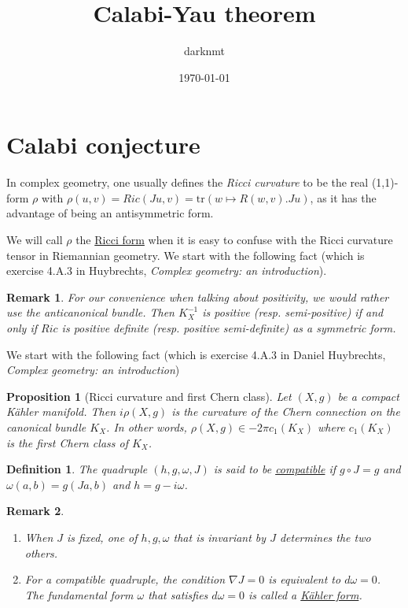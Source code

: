 \documentclass[11pt]{article}
\author{darknmt}
\date{\today}
\title{Calabi-Yau theorem}
\newtheorem{remark}{Remark}
\newtheorem{proposition}{Proposition}[theorem]
\newtheorem{definition}{Definition}
\begin{document}
\maketitle
\tableofcontents


\section{Calabi conjecture}
\label{sec:org0cb0938}

In complex geometry, one usually defines the \emph{Ricci curvature} to be the real (1,1)-form \(\rho\)
with \(\rho(u,v) = Ric(Ju, v) = \text{tr}(w \mapsto R(w,v).Ju)\), as it has the advantage of being an
antisymmetric form.

We will call \(\rho\) the \uline{Ricci form} when it is easy to confuse with the Ricci
curvature tensor in Riemannian geometry. We start with the following fact (which is exercise 4.A.3
in Huybrechts, \emph{Complex geometry: an introduction}).

\begin{remark}
For our convenience when talking about positivity, we would rather use the anticanonical
bundle. Then \(K_{X}^{-1}\) is positive (resp. semi-positive) if and only if \(Ric\) is positive
definite (resp. positive semi-definite) as a symmetric form.
\end{remark}



We start with the following fact (which is exercise 4.A.3 in Daniel Huybrechts, \emph{Complex geometry: an introduction})

\begin{proposition}[Ricci curvature and first Chern class]
Let \((X,g)\) be a compact Kähler manifold. Then \(i\rho(X,g)\) is the curvature of the Chern connection
on the canonical bundle \(K_X\). In other words, \(\rho(X,g)\in -2\pi c_1(K_X)\) where
\(c_1(K_X)\) is the first Chern class of \(K_X\).
\end{proposition}


\begin{definition}
The quadruple \((h, g, \omega, J)\) is said to be \uline{compatible} if \(g\circ J = g\) and \(\omega(a,b) =
g(Ja,b)\) and \(h = g - i\omega\). 
\end{definition}

\begin{remark}
\begin{enumerate}
\item When \(J\) is fixed, one of \(h,g,\omega\) that is invariant by \(J\) determines the two others.
\item For a compatible quadruple, the condition \(\nabla J = 0\) is equivalent to \(d\omega = 0\). The
fundamental form \(\omega\) that satisfies \(d\omega = 0\) is called a \uline{Kähler form}.
\end{enumerate}
\end{remark}
\end{document}
